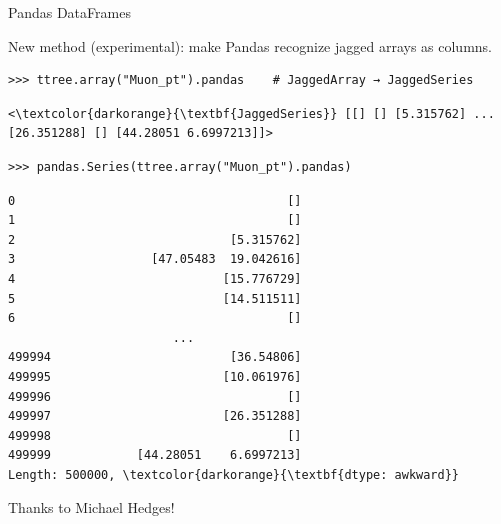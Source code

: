 \documentclass[aspectratio=169]{beamer}
\begin{document}
\begin{frame}[fragile]{Pandas DataFrames}
\large
\vspace{0.25 cm}

New method (experimental): make Pandas recognize jagged arrays as columns.

\small
\begin{verbatim}
>>> ttree.array("Muon_pt").pandas    # JaggedArray → JaggedSeries
\end{verbatim}
\scriptsize\color{darkblue}\vspace{-0.75\baselineskip}\begin{Verbatim}[commandchars=\\\{\}]
<\textcolor{darkorange}{\textbf{JaggedSeries}} [[] [] [5.315762] ... [26.351288] [] [44.28051 6.6997213]]>
\end{Verbatim}
\color{black}

\small
\begin{verbatim}
>>> pandas.Series(ttree.array("Muon_pt").pandas)
\end{verbatim}
\scriptsize\color{darkblue}\vspace{-0.75\baselineskip}\begin{Verbatim}[commandchars=\\\{\}]
0                                      []
1                                      []
2                              [5.315762]
3                   [47.05483  19.042616]
4                             [15.776729]
5                             [14.511511]
6                                      []
                       ...               
499994                         [36.54806]
499995                        [10.061976]
499996                                 []
499997                        [26.351288]
499998                                 []
499999            [44.28051    6.6997213]
Length: 500000, \textcolor{darkorange}{\textbf{dtype: awkward}}
\end{Verbatim}
\color{black}
\large

\vspace{-3 cm}
\hfill \begin{minipage}{0.35\linewidth}
Thanks to Michael Hedges!
\end{minipage}
\vspace{3 cm}
\end{frame}
\end{document}
